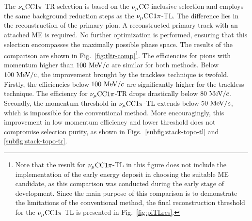           The $\nu_{\mu}\textrm{CC}1\pi$-TR selection is based on the $\nu_{\mu}\textrm{CC}$-inclusive selection and employs the same background reduction steps as the $\nu_{\mu}\textrm{CC}1\pi$-TL.
          The difference lies in the reconstruction of the primary pion.
          A reconstructed primary track with an attached ME is required.
          No further optimization is performed, ensuring that this selection encompasses the maximally possible phase space.
          The results of the comparison are shown in Fig.~\ref{fig:tltr-comp}\footnote{Note that the result for $\nu_{\mu}\textrm{CC}1\pi$-TL in this figure does not include the implementation of the early energy deposit in choosing the suitable ME candidate, as this comparison was conducted during the early stage of development. 
          Since the main purpose of this comparison is to demonstrate the limitations of the conventional method, the final reconstruction threshold for the $\nu_{\mu}\textrm{CC}1\pi$-TL is presented in Fig.~\ref{fig:piTLres}.}.
          The efficiencies for pions with momentum higher than $100~\textrm{MeV}/c$ are similar for both methods.
          Below $100~\textrm{MeV}/c$, the improvement brought by the trackless technique is twofold.
          Firstly, the efficiencies below $100~\textrm{MeV}/c$ are significantly higher for the trackless technique.
          The efficiency for $\nu_{\mu}\textrm{CC}1\pi$-TR drops drastically below $80~\textrm{MeV}/c$.
          Secondly, the momentum threshold in $\nu_{\mu}\textrm{CC}1\pi$-TL extends below $50~\textrm{MeV}/c$, which is impossible for the conventional method.
          More encouragingly, this improvement in low momentum efficiency and lower threshold does not compromise selection purity, as shown in Figs.~\ref{subfig:stack-topo-tl} and \ref{subfig:stack-topo-tr}.

